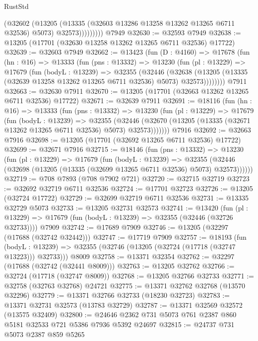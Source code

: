 \begin{lexlean}{RustStd}
\begin{coremodule}
                  (@32602
                    (@13205
                      (@13335 (@32603 @13286 @13258 @13262 @13265 @6711 @32536) @5073)
                      @32573)))))))))
    @7949
@32630 := @32593 @7949
@32638 := @13205 (@17701 (@32630 @13258 @13262 @13265 @6711 @32536) @17722)
@32639 := @32603 @7949
@32662 := @13423
    (fun (D : @4160) =>
    @17678
      (fun (hn : @16) =>
      @13333
        (fun (pns : @13332) =>
        @13230
          (fun (pl : @13229) =>
          @17679
            (fun (bodyL : @13239) =>
            @32355
              (@32446
                (@32638
                  (@13205 (@13335 (@32639 @13258 @13262 @13265 @6711 @32536) @5073) @32573))))))))
    @7911
@32663 := @32630 @7911
@32670 := @13205 (@17701 (@32663 @13262 @13265 @6711 @32536) @17722)
@32671 := @32639 @7911
@32691 := @18116
    (fun (hn : @16) =>
    @13333
      (fun (pns : @13332) =>
      @13230
        (fun (pl : @13229) =>
        @17679
          (fun (bodyL : @13239) =>
          @32355
            (@32446 (@32670 (@13205 (@13335 (@32671 @13262 @13265 @6711 @32536) @5073) @32573)))))))
    @7916
@32692 := @32663 @7916
@32698 := @13205 (@17701 (@32692 @13265 @6711 @32536) @17722)
@32699 := @32671 @7916
@32715 := @18146
    (fun (pns : @13332) =>
    @13230
      (fun (pl : @13229) =>
      @17679
        (fun (bodyL : @13239) =>
        @32355 (@32446 (@32698 (@13205 (@13335 (@32699 @13265 @6711 @32536) @5073) @32573))))))
@32719 := @708 @7893 (@708 @7902 @721)
@32720 := @32715 @32719
@32723 := @32692 @32719 @6711 @32536
@32724 := @17701 @32723
@32726 := @13205 (@32724 @17722)
@32729 := @32699 @32719 @6711 @32536
@32731 := @13335 @32729 @5073
@32733 := @13205 @32731 @32573
@32741 := @13420
    (fun (pl : @13229) => @17679 (fun (bodyL : @13239) => @32355 (@32446 (@32726 @32733))))
    @7909
@32742 := @17689 @7909
@32746 := @13205 (@32297 (@17688 (@32742 @32442)))
@32747 := @17719 @7909
@32757 := @18193
    (fun (bodyL : @13239) => @32355 (@32746 (@13205 (@32724 (@17718 (@32747 @13223))) @32733)))
    @8009
@32758 := @13371 @32354
@32762 := @32297 (@17688 (@32742 (@32441 @8009)))
@32763 := @13205 @32762
@32766 := @32724 (@17718 (@32747 @8009))
@32768 := @13205 @32766 @32733
@32771 := @32758 (@32763 @32768) @24721
@32775 := @13371 @32762 @32768 (@13570 @32296)
@32779 := @13371 @32766 @32733 (@18230 @32723)
@32783 := @13371 @32731 @32573 (@13783 @32729)
@32787 := @13371 @32569 @32572 (@13575 @32409)
@32800 := @24646 @2362 @731 @5073 @761 @2387 @860 @5181 @32533 @721 @5386 @7936 @5392 @24697
@32815 := @24737
    @731
    @5073
    @2387
    @859
    @5265

\end{coremodule}
\end{lexlean}
